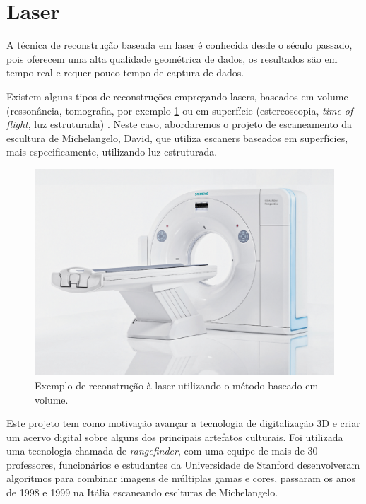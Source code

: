 \section{Laser}\label{sec:laser}

A técnica de reconstrução baseada em laser é conhecida desde o século passado, pois oferecem uma alta qualidade geométrica de dados, os resultados são em tempo real e requer pouco tempo de captura de dados. 

Existem alguns tipos de reconstruções empregando lasers, baseados em volume (ressonância, tomografia, por exemplo \ref{fig:laservolume} ou em superfície (estereoscopia, {\it time of flight}, luz estruturada) . Neste caso, abordaremos o projeto de escaneamento da escultura de Michelangelo, David, que utiliza escaners baseados em superfícies, mais especificamente, utilizando luz estruturada.

\begin{figure}[!h]
	\centering
	\includegraphics[width=1\linewidth]{figs/tomografia.png}
	\caption{%
	Exemplo de reconstrução à laser utilizando o método baseado em volume.
	}\label{fig:laservolume}
\end{figure}

Este projeto tem como motivação avançar a tecnologia de digitalização 3D e criar um acervo digital sobre alguns dos principais artefatos culturais. Foi utilizada uma tecnologia chamada de {\it rangefinder}, com uma equipe de mais de 30 professores, funcionários e estudantes da Universidade de Stanford desenvolveram algoritmos para combinar imagens de múltiplas gamas e cores, passaram os anos de 1998 e 1999 na Itália escaneando esclturas de Michelangelo. 

